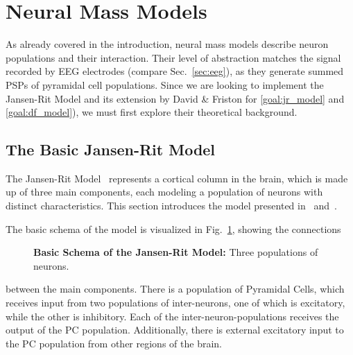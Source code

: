 \newcommand*\circled[2][black]{\tikz[baseline=(char.base)]{
    \node[scale=0.85pt,shape=circle, thin,draw=#1!60, fill=#1!5,inner sep=0.1pt] (char) {#2};}}



\section{Neural Mass Models}\label{sec:neural-mass-models}

As already covered in the introduction,
neural mass models describe neuron populations and their interaction.
Their level of abstraction matches the signal recorded by EEG electrodes (compare Sec.~\ref{sec:eeg}),
as they generate summed PSPs of pyramidal cell populations.
Since we are looking to implement the Jansen-Rit Model and its extension by David \& Friston
for \ref{goal:jr_model} and \ref{goal:df_model}),
we must first explore their theoretical background.

\subsection{The Basic Jansen-Rit Model}\label{subsec:the-jansen-rit-model}

The Jansen-Rit Model~\cite{jansen_neurophysiologically-based_1993, jansen_electroencephalogram_1995}
represents a cortical column in the brain, which is made up of three main components,
each modeling a population of neurons with distinct characteristics.
This section introduces the model presented in~\cite{jansen_neurophysiologically-based_1993}
and~\cite{jansen_electroencephalogram_1995}.

The basic schema of the model is visualized in Fig.~\ref{fig:Jansen Rit Flowchart}, showing the connections
\begin{figure}
    
    \caption{\textbf{Basic Schema of the Jansen-Rit Model:} Three populations of neurons.}
    \label{fig:Jansen Rit Flowchart}
\end{figure}
between the main components.
There is a population of Pyramidal Cells, which receives input from two populations of inter-neurons,
one of which is excitatory, while the other is inhibitory.
Each of the inter-neuron-populations receives the output of the PC population.
Additionally, there is external excitatory input to the PC population from other regions of the brain.

